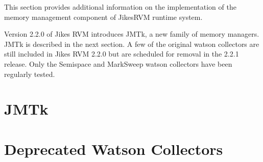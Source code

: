 This section provides additional information on the implementation
of the memory management component of Jikes\trademark RVM runtime system.

Version 2.2.0 of Jikes RVM introduces JMTk, a new family of memory
managers. JMTk is described in the next section. A few of the original
watson collectors are still included in Jikes RVM 2.2.0 but are
scheduled for removal in the 2.2.1 release.  Only the Semispace and
MarkSweep watson collectors have been regularly tested. 
 
\section{JMTk}


\section{Deprecated Watson Collectors}


